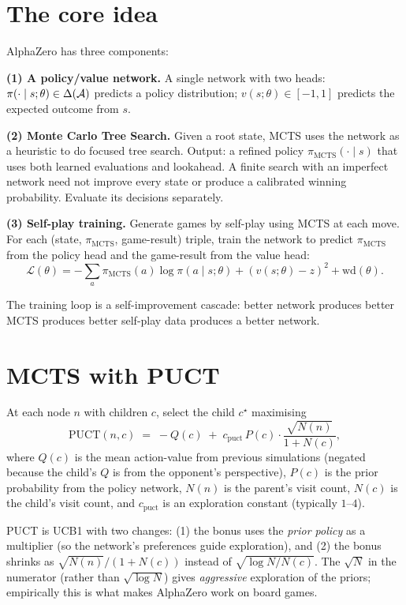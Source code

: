 \documentclass[11pt,oneside]{scrbook}
\newcommand{\PUCT}{\mathrm{PUCT}}
\begin{document}
\section{The core idea}

AlphaZero has three components:

\textbf{(1) A policy/value network.} A single network with two heads:
$\pi(\cdot \mid s; \theta) \in \Delta(\mathcal{A})$ predicts a policy
distribution; $v(s; \theta) \in [-1, 1]$ predicts the expected outcome from
$s$.

\textbf{(2) Monte Carlo Tree Search.} Given a root state, MCTS uses the
network as a heuristic to do focused tree search. Output: a refined policy
$\pi_{\mathrm{MCTS}}(\cdot \mid s)$ that uses both learned evaluations and lookahead. A finite search with
an imperfect network need not improve every state or produce a calibrated
winning probability. Evaluate its decisions separately.

\textbf{(3) Self-play training.} Generate games by self-play using MCTS at
each move. For each (state, $\pi_{\mathrm{MCTS}}$, game-result) triple,
train the network to predict $\pi_{\mathrm{MCTS}}$ from the policy head
and the game-result from the value head:
\[
\mathcal{L}(\theta) = -\sum_a \pi_{\mathrm{MCTS}}(a) \log \pi(a \mid s; \theta) + (v(s; \theta) - z)^2 + \mathrm{wd}(\theta).
\]

The training loop is a self-improvement cascade: better network produces
better MCTS produces better self-play data produces a better network.

\section{MCTS with PUCT}

\begin{definition}
At each node $n$ with children $c$, select the child $c^\star$ maximising
\[
\PUCT(n, c) \;=\; -Q(c) \;+\; c_{\mathrm{puct}}\, P(c) \cdot \frac{\sqrt{N(n)}}{1 + N(c)},
\]
where $Q(c)$ is the mean action-value from previous simulations (negated
because the child's $Q$ is from the opponent's perspective), $P(c)$ is the
prior probability from the policy network, $N(n)$ is the parent's visit
count, $N(c)$ is the child's visit count, and $c_{\mathrm{puct}}$ is an
exploration constant (typically $1$--$4$).
\end{definition}

\begin{intuition}
PUCT is UCB1 with two changes: (1) the bonus uses the \emph{prior policy}
as a multiplier (so the network's preferences guide exploration), and (2)
the bonus shrinks as $\sqrt{N(n)} / (1 + N(c))$ instead of
$\sqrt{\log N / N(c)}$. The $\sqrt{N}$ in the numerator (rather than
$\sqrt{\log N}$) gives \emph{aggressive} exploration of the priors;
empirically this is what makes AlphaZero work on board games.
\end{intuition}
\end{document}

